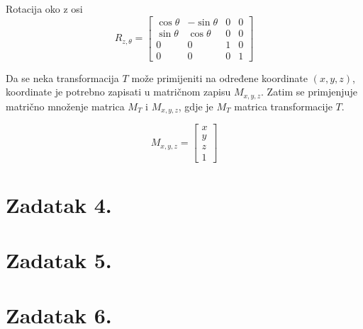 \documentclass[a4paper,12pt]{article}
\begin{document}
Rotacija oko z osi
\[
R_{z,\theta}=
\begin{bmatrix}
    \cos{\theta} & -\sin{\theta} & 0 & 0 \\
    \sin{\theta} & \cos{\theta} & 0 & 0 \\
    0 & 0 & 1 & 0 \\
    0 & 0 & 0 & 1
\end{bmatrix}
\]

\pagebreak

Da se neka transformacija $T$ može primijeniti na određene koordinate $(x, y, z)$, koordinate je
potrebno zapisati u matričnom zapisu $M_{x,y,z}$. Zatim se primjenjuje matrično množenje
matrica $M_T$ i $M_{x,y,z}$, gdje je $M_T$ matrica transformacije $T$.

\[
M_{x,y,z}=
\begin{bmatrix}
    x \\
    y \\
    z \\
    1
\end{bmatrix}
\]
\pagebreak

\section{Zadatak 4.}
\pagebreak

\section{Zadatak 5.}
\pagebreak
\section{Zadatak 6.}
\pagebreak
\end{document}
